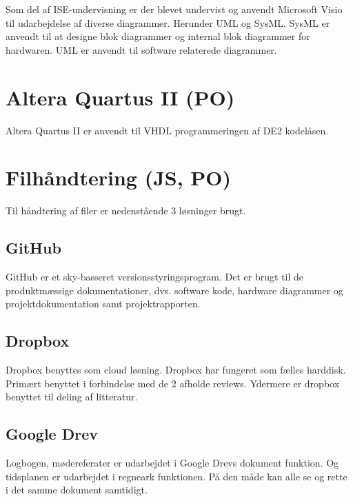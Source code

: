 Som del af ISE-undervisning er der blevet undervist og anvendt Microsoft Visio til udarbejdelse af diverse diagrammer. Herunder UML og SysML. SysML er anvendt til at designe blok diagrammer og internal blok diagrammer for hardwaren. UML er anvendt til software relaterede diagrammer. 

\section{Altera Quartus II (PO)}
Altera Quartus II er anvendt til VHDL programmeringen af DE2 kodelåsen.

\section{Filhåndtering (JS, PO)}
Til håndtering af filer er nedenstående 3 løsninger brugt. 

\subsection{GitHub}
GitHub er et sky-basseret versionsstyringsprogram. Det er brugt til de produktmæssige dokumentationer, dvs. software kode, hardware diagrammer og projektdokumentation samt projektrapporten.

\subsection{Dropbox}
Dropbox benyttes som cloud løsning. Dropbox har fungeret som fælles harddisk. Primært benyttet i forbindelse med de 2 afholde reviews. Ydermere er dropbox benyttet til deling af litteratur. 

\subsection{Google Drev}
Logbogen, mødereferater er udarbejdet i Google Drevs dokument funktion. Og tidsplanen er udarbejdet i regneark funktionen. På den måde kan alle se og rette i det samme dokument samtidigt. 



